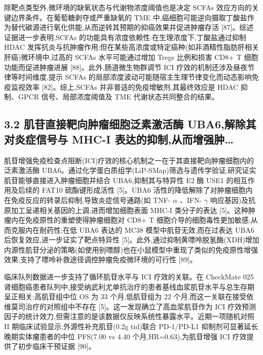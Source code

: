 除靶点类型外,微环境的缺氧状态与代谢物浓度阈值也是决定 SCFAs 效应方向的关键边界条件。在葡萄糖剥夺或严重缺氧的 TME 中,癌细胞可能逆向摄取丁酸盐作为替代碳源进行氧化供能,从而逆转其预期的抑癌效果并促进肿瘤存活 {[}87{]}。综述证据进一步表明,SCFAs 的功能具有浓度依赖性:在生理浓度下,丁酸盐通过抑制 HDAC 发挥抗炎与抗肿瘤作用;但在某些高浓度或特定癌种(如非酒精性脂肪肝相关肝癌)微环境中,过高的 SCFAs 水平可能通过增加 Tregs 比例和损害 CD8+ T 细胞功能而促进肿瘤进展 {[}88{]}。此外,肠道微生物群调节 ICI 疗效的机制还涉及昼夜节律等时间维度,提示 SCFAs 的局部浓度波动可能随宿主生理节律变化而动态影响免疫监视效率 {[}82{]}。综上,SCFAs 并非普适的免疫增敏剂,其最终效应是 HDAC 抑制、GPCR 信号、局部浓度阈值及 TME 代谢状态共同整合的结果。

\subsection{3.2 肌苷直接靶向肿瘤细胞泛素激活酶 UBA6,解除其对炎症信号与 MHC-I 表达的抑制,从而增强肿\ldots{}}\label{ux808cux82f7ux76f4ux63a5ux9776ux5411ux80bfux7624ux7ec6ux80deux6cdbux7d20ux6fc0ux6d3bux9176-uba6ux89e3ux9664ux5176ux5bf9ux708eux75c7ux4fe1ux53f7ux4e0e-mhc-i-ux8868ux8fbeux7684ux6291ux5236ux4eceux800cux589eux5f3aux80bf}

肌苷增强免疫检查点阻断(ICI)疗效的核心机制之一在于其直接靶向肿瘤细胞内的泛素激活酶 UBA6。通过化学蛋白质组学(LiP-SMap)筛选与遗传学验证,研究证实肌苷能够直接进入肿瘤细胞并结合 UBA6,抑制其与特异性 E2 酶 USE1 的相互作用及后续的 FAT10 硫酯键形成活性 {[}5{]}。UBA6 活性的降低解除了对肿瘤细胞内在免疫反应的转录后抑制,导致炎症信号通路(如 TNF- \(\alpha\) 、IFN- \(\gamma\) 响应基因)及抗原加工呈递相关基因的上调,进而增加细胞表面 MHC-I 类分子的表达 {[}5{]}。这种肿瘤内在免疫原性的重塑使得肿瘤细胞对 CD8+ T 细胞介导的细胞毒性更加敏感,从而克服内在耐药性;在低 UBA6 表达的 MC38 模型中肌苷无效,而在过表达 UBA6 后恢复效应,进一步证实了靶点特异性 {[}5{]}。此外,通过抑制黄嘌呤脱氢酶(XDH)增加内源性肌苷分泌的策略(如使用别嘌醇)也在小鼠模型中重现了类似的免疫原性增强效果,支持了嘌呤补救途径调控肿瘤免疫微环境的可行性 {[}89{]}。

临床队列数据进一步支持了循环肌苷水平与 ICI 疗效的关联。在 CheckMate 025 肾细胞癌患者队列中,接受纳武利尤单抗治疗的患者基线血浆肌苷水平与总生存期呈正相关:高肌苷组中位 OS 为 33 个月,低肌苷组为 22 个月,而这一关联在接受依维莫司治疗的对照组中不存在 {[}5{]}。这一发现确立了高血浆肌苷作为 ICI 疗效预测因子的统计效力,但需注意的是该数据仅反映系统性暴露水平。近期一项随机对照 II 期临床试验显示,外源性补充肌苷(0.2g tid)联合 PD-1/PD-L1 抑制剂可显著延长晚期实体瘤患者的中位 PFS(7.00 vs 4.40 个月,HR=0.63),为肌苷增强 ICI 疗效提供了初步临床干预证据 {[}90{]}。

